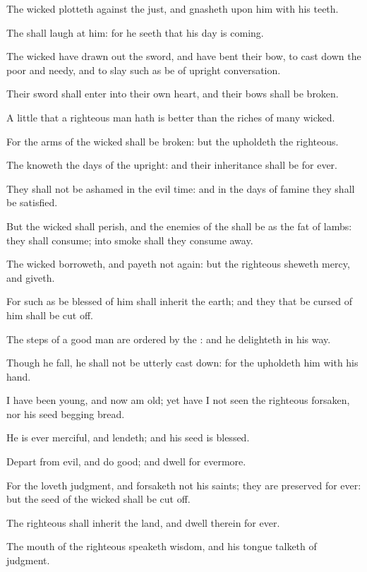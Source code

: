\verse The wicked plotteth against the just, and gnasheth upon him with his teeth.

\verse The \LORD shall laugh at him: for he seeth that his day is coming.

\verse The wicked have drawn out the sword, and have bent their bow, to cast down the poor and needy, and to slay such as be of upright conversation.

\verse Their sword shall enter into their own heart, and their bows shall be broken.

\verse A little that a righteous man hath is better than the riches of many wicked.

\verse For the arms of the wicked shall be broken: but the \LORD upholdeth the righteous.

\verse The \LORD knoweth the days of the upright: and their inheritance shall be for ever.

\verse They shall not be ashamed in the evil time: and in the days of famine they shall be satisfied.

\verse But the wicked shall perish, and the enemies of the \LORD shall be as the fat of lambs: they shall consume; into smoke shall they consume away.

\verse The wicked borroweth, and payeth not again: but the righteous sheweth mercy, and giveth.

\verse For such as be blessed of him shall inherit the earth; and they that be cursed of him shall be cut off.

\verse The steps of a good man are ordered by the \LORD: and he delighteth in his way.

\verse Though he fall, he shall not be utterly cast down: for the \LORD upholdeth him with his hand.

\verse I have been young, and now am old; yet have I not seen the righteous forsaken, nor his seed begging bread.

\verse He is ever merciful, and lendeth; and his seed is blessed.

\verse Depart from evil, and do good; and dwell for evermore.

\verse For the \LORD loveth judgment, and forsaketh not his saints; they are preserved for ever: but the seed of the wicked shall be cut off.

\verse The righteous shall inherit the land, and dwell therein for ever.

\verse The mouth of the righteous speaketh wisdom, and his tongue talketh of judgment.

